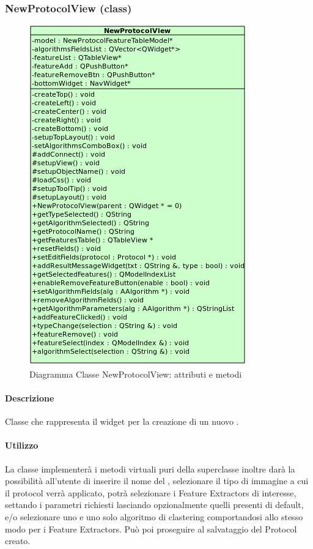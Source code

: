\subsubsection{NewProtocolView (class)}
\label{speNproV}
\begin{figure}[!h]
\centering
			\includegraphics[width=0.6\linewidth]{./Content/Immagini/view/NewProtocolView.png}
			\caption{Diagramma Classe NewProtocolView: attributi e metodi}
			\label{cl_nsproview}
\end{figure}
\paragraph{Descrizione \\}
Classe che rappresenta il widget per la creazione di un nuovo \protocol{}.
\paragraph{Utilizzo\\}
La classe implementerà i metodi virtuali puri della superclasse inoltre darà la possibilità all'utente di inserire il nome del \protocol{}, selezionare il tipo di immagine a cui il protocol\g{} verrà applicato, potrà selezionare i Feature Extractors\g{} di interesse, settando i parametri richiesti lasciando opzionalmente quelli presenti di default, e/o selezionare uno e uno solo algoritmo di clastering\g{} comportandosi allo stesso modo per i Feature Extractors\g{}. Può poi proseguire al salvataggio del Protocol\g{} creato.
